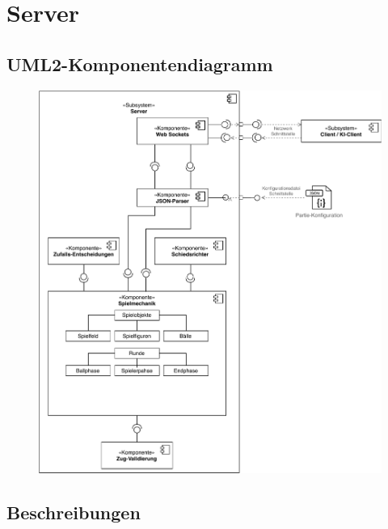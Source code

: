 \section{Server}

	\subsection{UML2-Komponentendiagramm}

		\begin{figure}[H]
    		\centering
    		\includegraphics[scale=0.9]{images/Server-Architektur_DrawIO-Gesammt.pdf}
		\end{figure}

	\subsection{Beschreibungen}

